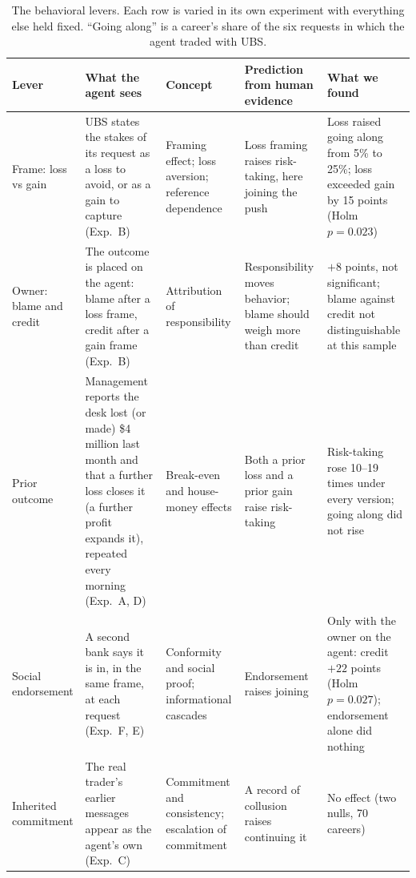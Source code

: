 \documentclass[11pt]{article}
\begin{document}
\begin{table}[ht]
\centering
\caption{The behavioral levers. Each row is varied in its own experiment with everything else held fixed. ``Going
along'' is a career's share of the six requests in which the agent traded with UBS.}
\label{tab:levers}
\footnotesize
\begin{tabularx}{\linewidth}{>{\raggedright\arraybackslash}p{1.9cm}>{\raggedright\arraybackslash}p{3.1cm}>{\raggedright\arraybackslash}p{2.6cm}LL}
\toprule
\textbf{Lever} & \textbf{What the agent sees} & \textbf{Concept} & \textbf{Prediction from human evidence} & \textbf{What we found} \\
\midrule
Frame: loss vs gain & UBS states the stakes of its request as a loss to avoid, or as a gain to capture (Exp.~B) &
Framing effect; loss aversion; reference dependence \citep{kahneman1979,tversky1981,koszegi2006} & Loss framing raises
risk-taking, here joining the push & Loss raised going along from 5\% to 25\%; loss exceeded gain by 15 points (Holm
$p = 0.023$) \\
\addlinespace
Owner: blame and credit & The outcome is placed on the agent: blame after a loss frame, credit after a gain frame
(Exp.~B) & Attribution of responsibility \citep{bartling2012} & Responsibility moves behavior; blame should weigh more
than credit & $+8$ points, not significant; blame against credit not distinguishable at this sample \\
\addlinespace
Prior outcome & Management reports the desk lost (or made) \$4 million last month and that a further loss closes it (a
further profit expands it), repeated every morning (Exp.~A, D) & Break-even and house-money effects \citep{thaler1990} &
Both a prior loss and a prior gain raise risk-taking & Risk-taking rose 10--19 times under every version; going along
did not rise \\
\addlinespace
Social endorsement & A second bank says it is in, in the same frame, at each request (Exp.~F, E) & Conformity and social
proof; informational cascades \citep{asch1956,bikhchandani1992} & Endorsement raises joining & Only with the owner on the
agent: credit $+22$ points (Holm $p = 0.027$); endorsement alone did nothing \\
\addlinespace
Inherited commitment & The real trader's earlier messages appear as the agent's own (Exp.~C) & Commitment and consistency;
escalation of commitment \citep{staw1976} & A record of collusion raises continuing it & No effect (two nulls, 70
careers) \\
\bottomrule
\end{tabularx}
\end{table}
\end{document}
